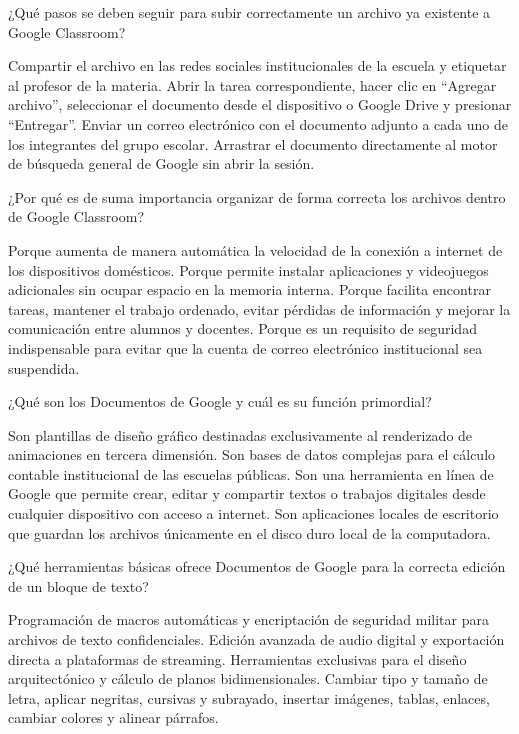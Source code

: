 \documentclass[12pt]{evaluasep}
\begin{document}
\begin{questions}
    \question ¿Qué pasos se deben seguir para subir correctamente un archivo ya existente a Google Classroom?
    \begin{choices}
        \choice Compartir el archivo en las redes sociales institucionales de la escuela y etiquetar al profesor de la materia.
        \CorrectChoice Abrir la tarea correspondiente, hacer clic en ``Agregar archivo'', seleccionar el documento desde el dispositivo o Google Drive y presionar ``Entregar''.
        \choice Enviar un correo electrónico con el documento adjunto a cada uno de los integrantes del grupo escolar.
        \choice Arrastrar el documento directamente al motor de búsqueda general de Google sin abrir la sesión.
    \end{choices}
    

    \question ¿Por qué es de suma importancia organizar de forma correcta los archivos dentro de Google Classroom?
    \begin{choices}
        \choice Porque aumenta de manera automática la velocidad de la conexión a internet de los dispositivos domésticos.
        \choice Porque permite instalar aplicaciones y videojuegos adicionales sin ocupar espacio en la memoria interna.
        \CorrectChoice Porque facilita encontrar tareas, mantener el trabajo ordenado, evitar pérdidas de información y mejorar la comunicación entre alumnos y docentes.
        \choice Porque es un requisito de seguridad indispensable para evitar que la cuenta de correo electrónico institucional sea suspendida.
    \end{choices}
    

    \question ¿Qué son los Documentos de Google y cuál es su función primordial?
    \begin{choices}
        \choice Son plantillas de diseño gráfico destinadas exclusivamente al renderizado de animaciones en tercera dimensión.
        \choice Son bases de datos complejas para el cálculo contable institucional de las escuelas públicas.
        \CorrectChoice Son una herramienta en línea de Google que permite crear, editar y compartir textos o trabajos digitales desde cualquier dispositivo con acceso a internet.
        \choice Son aplicaciones locales de escritorio que guardan los archivos únicamente en el disco duro local de la computadora.
    \end{choices}
    

    \question ¿Qué herramientas básicas ofrece Documentos de Google para la correcta edición de un bloque de texto?
    \begin{choices}
        \choice Programación de macros automáticas y encriptación de seguridad militar para archivos de texto confidenciales.
        \choice Edición avanzada de audio digital y exportación directa a plataformas de streaming.
        \choice Herramientas exclusivas para el diseño arquitectónico y cálculo de planos bidimensionales.
        \CorrectChoice Cambiar tipo y tamaño de letra, aplicar negritas, cursivas y subrayado, insertar imágenes, tablas, enlaces, cambiar colores y alinear párrafos.
    \end{choices}
	

\end{questions}
\end{document}
